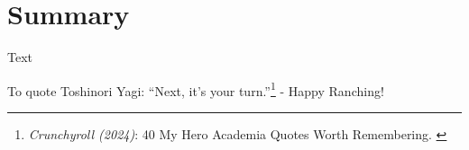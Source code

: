 %
%

\pagebreak
\section{Summary}

\onehalfspacing

Text

To quote Toshinori Yagi: “Next, it’s your turn.”\footnote{\textit{Crunchyroll (2024)}: 40 My Hero Academia Quotes Worth Remembering. \cite{mhaQuotes}} - Happy Ranching!
